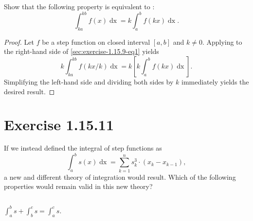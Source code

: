 \documentclass{report}
\begin{document}
Show that the following property is equivalent to
  :
  \begin{equation}
    \label{sec:exercise-1.15.9-eq1}
    \int_{ka}^{kb} f(x) \mathop{dx} = k \int_a^b f(kx) \mathop{dx}.
  \end{equation}

\begin{proof}

  Let $f$ be a step function on closed interval $[a, b]$ and $k \neq 0$.
  Applying  to the
    right-hand side of \eqref{sec:exercise-1.15.9-eq1} yields
    $$k\int_{ka}^{kb} f(kx / k) \mathop{dx} =
      k\left[k\int_a^b f(kx) \mathop{dx}\right].$$
  Simplifying the left-hand side and dividing both sides by $k$ immediately
    yields the desired result.

\end{proof}

\section{Exercise 1.15.11}%
\label{sec:exercise-1.15.11}

If we instead defined the integral of step functions as
  \begin{equation*}
    \label{sec:exercise-1.15.11-eq1}
    \int_a^b s(x) \mathop{dx} = \sum_{k=1}^n s_k^3 \cdot (x_k - x_{k-1}),
  \end{equation*}
  a new and different theory of integration would result.
Which of the following properties would remain valid in this new theory?

\subsection{}%
\label{sub:exercise-1.15.11a}

$\int_a^b s + \int_b^c s = \int_a^c s$.

\end{document}
